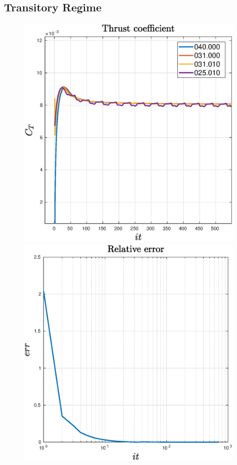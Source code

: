 \subsection{Transitory Regime}
\begin{frame}{\subsecname}
    
\begin{figure} [H]  
	\centering
	\subfloat
	{\includegraphics[scale=0.30]{Photos/Ct_iter.eps}}
  \quad
	\subfloat
	{\includegraphics[scale=0.30]{Photos/err_iter.eps}
}
\end{figure}
\end{frame}
